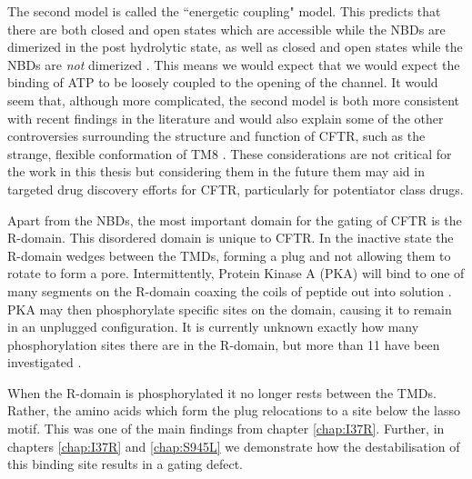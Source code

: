 The second model is called the ``energetic coupling" model. This predicts that there are both closed and open states which are accessible while the NBDs are dimerized in the post hydrolytic state, as well as closed and open states while the NBDs are \textit{not} dimerized \cite{jih2012}. This means we would expect that we would expect the binding of ATP to be loosely coupled to the opening of the channel. It would seem that, although more complicated, the second model is both more consistent with recent findings in the literature and would also explain some of the other controversies surrounding the structure and function of CFTR, such as the strange, flexible conformation of TM8 \cite{fay2018}. These considerations are not critical for the work in this thesis but considering them in the future them may aid in targeted drug discovery efforts for CFTR, particularly for potentiator class drugs.


Apart from the NBDs, the most important domain for the gating of CFTR is the R-domain. This disordered domain is unique to CFTR. In the inactive state the R-domain wedges between the TMDs, forming a plug and not allowing them to rotate to form a pore. Intermittently, Protein Kinase A (PKA) will bind to one of many segments on the R-domain coaxing the coils of peptide out into solution \cite{mihalyi2020}. PKA may then phosphorylate specific sites on the domain, causing it to remain in an unplugged configuration. It is currently unknown exactly how many phosphorylation sites there are in the R-domain, but more than 11 have been investigated \cite{mihalyi2020}. 

When the R-domain is phosphorylated it no longer rests between the TMDs. Rather, the amino acids which form the plug relocations to a site below the lasso motif. This was one of the main findings from chapter \ref{chap:I37R}. Further, in chapters \ref{chap:I37R} and \ref{chap:S945L} we demonstrate how the destabilisation of this binding site results in a gating defect.  




